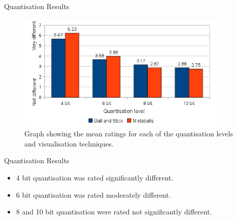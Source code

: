 \documentclass{beamer}
\begin{document}
\begin{frame}{Quantisation Results}
\begin{figure}
  \centering
  \includegraphics[width=100mm]{min-images/bm-means.png}
  \caption{Graph showing the mean ratings for each of the quantisation levels and visualisation techniques.}
\end{figure}
\end{frame}

\begin{frame}{Quantisation Results}
\begin{itemize}

  \item 4 bit quantisation was rated significantly different.

  \item 6 bit quantisation was rated moderately different.

  \item 8 and 10 bit quantisation were rated not significantly different.

\end{itemize}
\end{frame}


\end{document}
